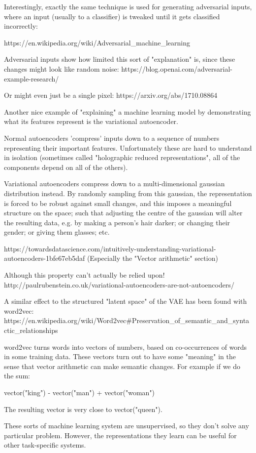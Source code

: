 Interestingly, exactly the same technique is used for generating
adversarial inputs, where an input (usually to a classifier) is tweaked
until it gets classified incorrectly:

https://en.wikipedia.org/wiki/Adversarial_machine_learning

Adversarial inputs show how limited this sort of "explanation" is, since
these changes might look like random noise:
https://blog.openai.com/adversarial-example-research/

Or might even just be a single pixel:
https://arxiv.org/abs/1710.08864

Another nice example of "explaining" a machine learning model by
demonstrating what its features represent is the variational
autoencoder.

Normal autoencoders 'compress' inputs down to a sequence of numbers
representing their important features. Unfortunately these are hard to
understand in isolation (sometimes called "holographic reduced
representations", all of the components depend on all of the others).

Variational autoencoders compress down to a multi-dimensional gaussian
distribution instead. By randomly sampling from this gaussian, the
representation is forced to be robust against small changes, and this
imposes a meaningful structure on the space; such that adjusting the
centre of the gaussian will alter the resulting data, e.g. by making a
person's hair darker; or changing their gender; or giving them glasses;
etc.

https://towardsdatascience.com/intuitively-understanding-variational-autoencoders-1bfe67eb5daf
(Especially the "Vector arithmetic" section)

Although this property can't actually be relied upon!
http://paulrubenstein.co.uk/variational-autoencoders-are-not-autoencoders/

A similar effect to the structured "latent space" of the VAE has been
found with word2vec:
https://en.wikipedia.org/wiki/Word2vec#Preservation_of_semantic_and_syntactic_relationships

word2vec turns words into vectors of numbers, based on co-occurrences of
words in some training data. These vectors turn out to have some
"meaning" in the sense that vector arithmetic can make semantic changes.
For example if we do the sum:

  vector("king") - vector("man") + vector("woman")

The resulting vector is very close to vector("queen").

These sorts of machine learning system are unsupervised, so they don't
solve any particular problem. However, the representations they learn
can be useful for other task-specific systems.
